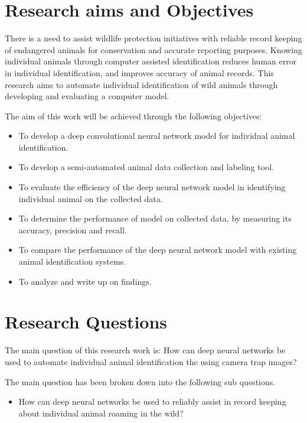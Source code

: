 \section{Research  aims  and Objectives}
There is a need to assist wildlife protection initiatives with reliable record keeping of endangered animals for conservation and accurate reporting purposes. Knowing individual animals through computer assisted identification reduces human error in individual identification, and improves accuracy of animal records. This research aims to automate individual identification of wild animals through developing and evaluating a computer model. 

The aim of this work will be achieved through the following objectives: 

\begin{itemize}

    \item To develop a deep convolutional neural network model for individual animal identification.
    \item To develop a semi-automated animal data collection and labeling tool.
    \item To evaluate the efficiency of the deep neural network model in identifying individual animal on the collected data.
    \item To determine the performance of model on collected data, by measuring its accuracy, precision and recall. 
    \item To compare the performance of the deep neural network model with existing animal identification systems. 
    \item To analyze and write up on findings.  
\end{itemize}
\section{Research Questions}
The main question of this research work is: 
How can deep neural networks be used to automate individual animal identification the using camera trap images?

The main question has been broken down into the following sub questions.
\begin{itemize}
    \item How can deep neural networks be used to reliably assist in record keeping about individual animal roaming in the wild?

\end{itemize}

